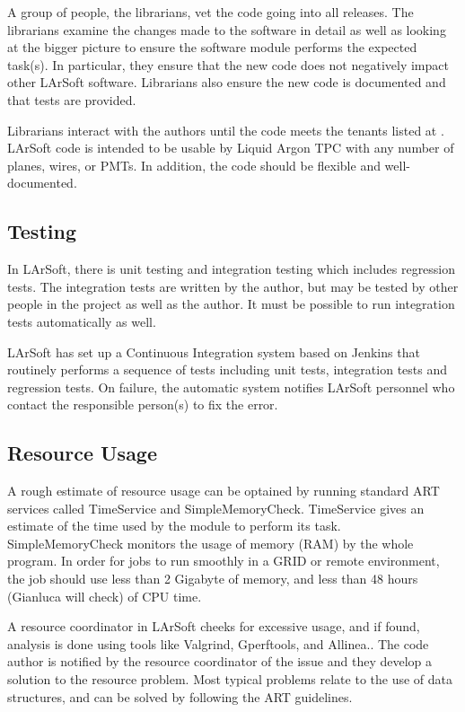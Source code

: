 \documentclass[12pt]{elsarticle}
\begin{document}
A group of people, the librarians, vet the code going into all releases. The librarians examine the changes made to the software in detail as well as looking at the bigger picture to ensure the software module performs the expected task(s). In particular, they ensure that the new code does not negatively impact other LArSoft software. Librarians also ensure the new code is documented and that tests are provided.

Librarians interact with the authors until the code meets the tenants listed at \cite{code-tenants}. LArSoft code is intended to be usable by Liquid Argon TPC with any number of planes, wires, or PMTs. In addition, the code should be flexible and well-documented. 

\subsection{Testing}

In LArSoft, there is unit testing and integration testing which includes regression tests. The integration tests are written by the author, but may be tested by other people in the project as well as the author. It must be possible to run integration tests automatically as well.

LArSoft has set up a Continuous Integration system based on Jenkins\cite{jenkins} that routinely performs a sequence of tests including unit tests, integration tests and regression tests. On failure, the automatic system notifies LArSoft personnel who contact the responsible person(s) to fix the error.

\subsection{Resource Usage}

A rough estimate of resource usage can be optained by running standard ART services called TimeService and SimpleMemoryCheck. TimeService gives an estimate of the time used by the module to perform its task. SimpleMemoryCheck monitors the usage of memory (RAM) by the whole program. In order for jobs to run smoothly in a GRID or remote environment, the job should use less than 2 Gigabyte of memory, and less than 48 hours (Gianluca will check) of CPU time.

A resource coordinator in LArSoft cheeks for excessive usage, and if found, analysis is done using tools like Valgrind\cite{valgrind}, Gperftools\cite{gperf}, and Allinea.\cite {allinea}.
The code author is notified by the resource coordinator of the issue and they develop a solution to the resource problem. Most typical problems relate to the use of data structures, and can be solved by following the ART guidelines.\cite{art-guide}
 
\end{document}
